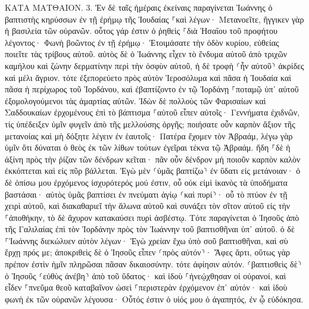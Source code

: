 \documentclass[twoside, 9pt]{extreport}
\begin{document}
ΚΑΤΑ ΜΑΤΘΑΙΟΝ.
3.
Ἐν δὲ ταῖς ἡμέραις ἐκείναις παραγίνεται Ἰωάννης ὁ βαπτιστὴς κηρύσσων ἐν τῇ ἐρήμῳ τῆς Ἰουδαίας 
⸀καὶ λέγων· Μετανοεῖτε, ἤγγικεν γὰρ ἡ βασιλεία τῶν οὐρανῶν. 
οὗτος γάρ ἐστιν ὁ ῥηθεὶς ⸀διὰ Ἠσαΐου τοῦ προφήτου λέγοντος· Φωνὴ βοῶντος ἐν τῇ ἐρήμῳ· Ἑτοιμάσατε τὴν ὁδὸν κυρίου, εὐθείας ποιεῖτε τὰς τρίβους αὐτοῦ. 
αὐτὸς δὲ ὁ Ἰωάννης εἶχεν τὸ ἔνδυμα αὐτοῦ ἀπὸ τριχῶν καμήλου καὶ ζώνην δερματίνην περὶ τὴν ὀσφὺν αὐτοῦ, ἡ δὲ τροφὴ ⸂ἦν αὐτοῦ⸃ ἀκρίδες καὶ μέλι ἄγριον. 
τότε ἐξεπορεύετο πρὸς αὐτὸν Ἱεροσόλυμα καὶ πᾶσα ἡ Ἰουδαία καὶ πᾶσα ἡ περίχωρος τοῦ Ἰορδάνου, 
καὶ ἐβαπτίζοντο ἐν τῷ Ἰορδάνῃ ⸀ποταμῷ ὑπ᾽ αὐτοῦ ἐξομολογούμενοι τὰς ἁμαρτίας αὐτῶν. 
Ἰδὼν δὲ πολλοὺς τῶν Φαρισαίων καὶ Σαδδουκαίων ἐρχομένους ἐπὶ τὸ βάπτισμα ⸀αὐτοῦ εἶπεν αὐτοῖς· Γεννήματα ἐχιδνῶν, τίς ὑπέδειξεν ὑμῖν φυγεῖν ἀπὸ τῆς μελλούσης ὀργῆς; 
ποιήσατε οὖν καρπὸν ἄξιον τῆς μετανοίας 
καὶ μὴ δόξητε λέγειν ἐν ἑαυτοῖς· Πατέρα ἔχομεν τὸν Ἀβραάμ, λέγω γὰρ ὑμῖν ὅτι δύναται ὁ θεὸς ἐκ τῶν λίθων τούτων ἐγεῖραι τέκνα τῷ Ἀβραάμ. 
ἤδη ⸀δὲ ἡ ἀξίνη πρὸς τὴν ῥίζαν τῶν δένδρων κεῖται· πᾶν οὖν δένδρον μὴ ποιοῦν καρπὸν καλὸν ἐκκόπτεται καὶ εἰς πῦρ βάλλεται. 
Ἐγὼ μὲν ⸂ὑμᾶς βαπτίζω⸃ ἐν ὕδατι εἰς μετάνοιαν· ὁ δὲ ὀπίσω μου ἐρχόμενος ἰσχυρότερός μού ἐστιν, οὗ οὐκ εἰμὶ ἱκανὸς τὰ ὑποδήματα βαστάσαι· αὐτὸς ὑμᾶς βαπτίσει ἐν πνεύματι ἁγίῳ ⸂καὶ πυρί⸃· 
οὗ τὸ πτύον ἐν τῇ χειρὶ αὐτοῦ, καὶ διακαθαριεῖ τὴν ἅλωνα αὐτοῦ καὶ συνάξει τὸν σῖτον αὐτοῦ εἰς τὴν ⸀ἀποθήκην, τὸ δὲ ἄχυρον κατακαύσει πυρὶ ἀσβέστῳ. 
Τότε παραγίνεται ὁ Ἰησοῦς ἀπὸ τῆς Γαλιλαίας ἐπὶ τὸν Ἰορδάνην πρὸς τὸν Ἰωάννην τοῦ βαπτισθῆναι ὑπ᾽ αὐτοῦ. 
ὁ δὲ ⸀Ἰωάννης διεκώλυεν αὐτὸν λέγων· Ἐγὼ χρείαν ἔχω ὑπὸ σοῦ βαπτισθῆναι, καὶ σὺ ἔρχῃ πρός με; 
ἀποκριθεὶς δὲ ὁ Ἰησοῦς εἶπεν ⸂πρὸς αὐτόν⸃· Ἄφες ἄρτι, οὕτως γὰρ πρέπον ἐστὶν ἡμῖν πληρῶσαι πᾶσαν δικαιοσύνην. τότε ἀφίησιν αὐτόν. 
⸂βαπτισθεὶς δὲ⸃ ὁ Ἰησοῦς ⸂εὐθὺς ἀνέβη⸃ ἀπὸ τοῦ ὕδατος· καὶ ἰδοὺ ⸀ἠνεῴχθησαν οἱ οὐρανοί, καὶ εἶδεν ⸀πνεῦμα θεοῦ καταβαῖνον ὡσεὶ ⸀περιστερὰν ἐρχόμενον ἐπ᾽ αὐτόν· 
καὶ ἰδοὺ φωνὴ ἐκ τῶν οὐρανῶν λέγουσα· Οὗτός ἐστιν ὁ υἱός μου ὁ ἀγαπητός, ἐν ᾧ εὐδόκησα. 
\end{document}
